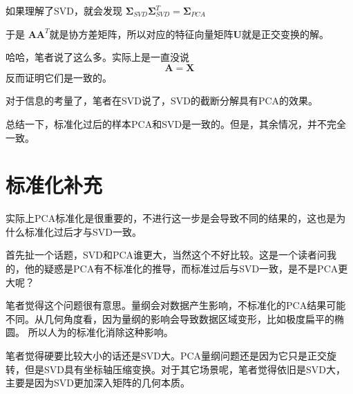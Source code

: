 \documentclass{article}
\begin{document}
    如果理解了SVD，就会发现
    $\boldsymbol{\Sigma}_{SVD}\boldsymbol{\Sigma}_{SVD}^T=\boldsymbol{\Sigma}_{PCA}$

    于是
    $\boldsymbol{A}\boldsymbol{A}^T$就是协方差矩阵，所以对应的特征向量矩阵$\boldsymbol{U}$就是正交变换的解。

    哈哈，笔者说了这么多。实际上是一直没说
    \[\boldsymbol{A}=\boldsymbol{X}\]
    反而证明它们是一致的。

    对于信息的考量了，笔者在SVD说了，SVD的截断分解具有PCA的效果。

    总结一下，标准化过后的样本PCA和SVD是一致的。但是，其余情况，并不完全一致。

    \section{标准化补充}
    实际上PCA标准化是很重要的，不进行这一步是会导致不同的结果的，这也是为什么标准化过后才与SVD一致。

    首先扯一个话题，SVD和PCA谁更大，当然这个不好比较。这是一个读者问我的，他的疑惑是PCA有不标准化的推导，而标准过后与SVD一致，是不是PCA更大呢？

    笔者觉得这个问题很有意思。量纲会对数据产生影响，不标准化的PCA结果可能不同。从几何角度看，因为量纲的影响会导致数据区域变形，比如极度扁平的椭圆。
    所以人为的标准化消除这种影响。

    笔者觉得硬要比较大小的话还是SVD大。PCA量纲问题还是因为它只是正交旋转，但是SVD具有坐标轴压缩变换。对于其它场景呢，笔者觉得依旧是SVD大，主要是因为SVD更加深入矩阵的几何本质。
\end{document}
